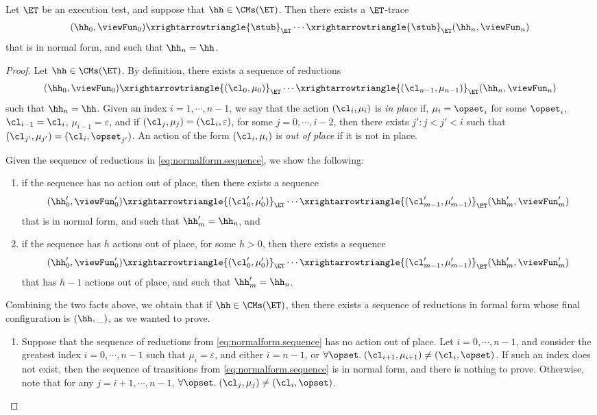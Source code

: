 \begin{proposition}
\label{prop:et.normalform}
Let $\ET$ be an execution test, and suppose that $\hh \in \CMs(\ET)$. Then there exists a $\ET$-trace  
\[
(\hh_0, \viewFun_0) \xrightarrowtriangle{\stub}_{\ET} \cdots \xrightarrowtriangle{\stub}_{\ET} (\hh_n, \viewFun_{n})
\]
that is in normal form, and such that $\hh_{n} = \hh$.
\end{proposition}
\begin{proof}
Let $\hh \in \CMs(\ET)$. By definition, there exists a sequence of reductions 
\begin{equation}
\label{eq:normalform.sequence}
(\hh_{0}, \viewFun_{0}) \xrightarrowtriangle{(\cl_0, \mu_0)}_{\ET} \cdots \xrightarrowtriangle{(\cl_{n-1}, \mu_{n-1})}_{\ET} (\hh_n, \viewFun_{n})
\end{equation}
such that $\hh_{n} = \hh$. Given an index $i = 1,\cdots, n-1$, we say that the action $(\cl_{i}, \mu_{i})$ is \emph{in place} 
if, $\mu_{i} = \opset_{i}$ for some $\opset_{i}$, $\cl_{i-1} = \cl_{i}$, $\mu_{i-1} = \varepsilon$, and if $(\cl_{j}, \mu_{j}) = (\cl_{i}, \varepsilon)$, 
for some  $j = 0,\cdots, i-2$, then there exists $j': j < j' < i$ such that $(\cl_{j'}, \mu_{j'}) = (\cl_i, \opset_{j'})$. An action of the 
form $(\cl_{i}, \mu_{i})$ is \emph{out of place} if it is not in place. 

Given the sequence of reductions in \cref{eq:normalform.sequence}, we show the following: 
\begin{enumerate}
\item if the sequence has no action out of place, then there exists a sequence 
\[
(\hh'_{0}, \viewFun'_{0}) \xrightarrowtriangle{(\cl'_{0}, \mu'_{0})}_{\ET} \cdots \xrightarrowtriangle{(\cl'_{m-1}, \mu'_{m-1})}_{\ET} (\hh'_{m}, \viewFun'_{m})
\]
that is in normal form, and such that $\hh'_{m} = \hh_{n}$, and 
\item if the sequence has $h$ actions out of place, for some $h > 0$, then there exists a sequence 
\[
(\hh'_{0}, \viewFun'_{0}) \xrightarrowtriangle{(\cl'_{0}, \mu'_{0})}_{\ET} \cdots \xrightarrowtriangle{(\cl'_{m-1}, \mu'_{m-1})}_{\ET} (\hh'_{m}, \viewFun'_{m})
\]
that has $h-1$ actions out of place, and such that $\hh'_{m} = \hh_{n}$.
\end{enumerate}
Combining the two facts above, we obtain that if $\hh \in \CMs(\ET)$, then there exists a sequence of reductions in formal form whose final 
configuration is $(\hh, \_)$, as we wanted to prove.

\begin{enumerate}
\item 
Suppose that the sequence of reductions from \cref{eq:normalform.sequence} has no action out of place. 
Let $i=0,\cdots, n-1$, and consider the greatest index $i=0,\cdots, n-1$ such that  
$\mu_{i} = \varepsilon$, and either $i = n-1$, or 
$\forall \opset.\; (\cl_{i+1}, \mu_{i+1}) \neq (\cl_{i}, \opset)$. 
If such an index does not exist, then the sequence of transitions from \cref{eq:normalform.sequence} is in 
normal form, and there is nothing to prove. Otherwise, note that for any $j = i+1,\cdots, n-1$, 
$\forall \opset.\;(\cl_{j}, \mu_{j}) \neq (\cl_{i}, \opset)$. 


\end{enumerate}
\end{proof}
